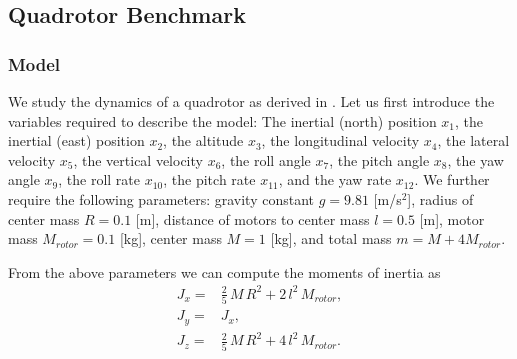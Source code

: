 \documentclass[EPiC]{easychair}
\begin{document}
\subsection{Quadrotor Benchmark}

\subsubsection{Model}

We study the dynamics of a quadrotor as derived in \cite[eq. (16) - (19)]{Beard2008}. Let us first introduce the variables required to describe the model: The inertial (north) position $x_1$, the inertial (east) position $x_2$, the altitude $x_3$, the longitudinal velocity $x_4$, the lateral velocity $x_5$, the vertical velocity $x_6$, the roll angle $x_7$, the pitch angle $x_8$, the yaw angle $x_9$, the roll rate $x_{10}$, the pitch rate $x_{11}$, and the yaw rate $x_{12}$. We further require the following parameters: gravity constant $g = 9.81$ [m/s$^2$], radius of center mass $R = 0.1$ [m], distance of motors to center mass $l = 0.5$ [m], motor mass $M_{rotor} = 0.1$ [kg], center mass $M = 1$ [kg], and total mass $m = M + 4M_{rotor}$.

From the above parameters we can compute the moments of inertia as 
\begin{equation*}
\begin{split}
J_x =& \frac{2}{5} \, M \, R^2 + 2 \, l^2 \, M_{rotor}, \\
J_y =& J_x, \\
J_z =& \frac{2}{5} \, M \, R^2 + 4 \, l^2 \, M_{rotor}.
\end{split}
\end{equation*}
\end{document}
